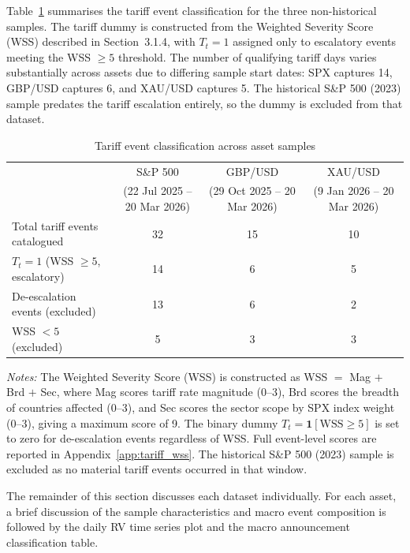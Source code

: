 \documentclass[12pt,a4paper]{report}
\begin{document}
Table~\ref{tab:tariff_summary} summarises the tariff event classification for the three non-historical samples. The tariff dummy is constructed from the Weighted Severity Score (WSS) described in Section~3.1.4, with $T_t = 1$ assigned only to escalatory events meeting the WSS $\geq 5$ threshold. The number of qualifying tariff days varies substantially across assets due to differing sample start dates: SPX captures 14, GBP/USD captures 6, and XAU/USD captures 5. The historical S\&P 500 (2023) sample predates the tariff escalation entirely, so the dummy is excluded from that dataset.

\begin{table}[H]
\centering
\caption{Tariff event classification across asset samples}
\label{tab:tariff_summary}
\begin{threeparttable}
\begin{tabular}{lccc}
\toprule
 & S\&P 500 & GBP/USD & XAU/USD \\
 & (22 Jul 2025 -- 20 Mar 2026) & (29 Oct 2025 -- 20 Mar 2026) & (9 Jan 2026 -- 20 Mar 2026) \\
\midrule
Total tariff events catalogued              & 32 & 15 & 10 \\
\quad $T_t = 1$ (WSS $\geq 5$, escalatory) & 14 & 6  & 5  \\
\quad De-escalation events (excluded)       & 13 & 6  & 2  \\
\quad WSS $< 5$ (excluded)                  & 5  & 3  & 3  \\
\bottomrule
\end{tabular}
\begin{tablenotes}
\small
\item \textit{Notes:} The Weighted Severity Score (WSS) is constructed as WSS $=$ Mag $+$ Brd $+$ Sec,
where Mag scores tariff rate magnitude (0--3), Brd scores the breadth of countries affected (0--3), and
Sec scores the sector scope by SPX index weight (0--3), giving a maximum score of 9. The binary dummy
$T_t = \mathbf{1}[\text{WSS} \geq 5]$ is set to zero for de-escalation events regardless of WSS. Full
event-level scores are reported in Appendix~\ref{app:tariff_wss}. The historical S\&P 500 (2023) sample
is excluded as no material tariff events occurred in that window.
\end{tablenotes}
\end{threeparttable}
\end{table}

\noindent The remainder of this section discusses each dataset individually. For each asset, a brief discussion of the sample characteristics and macro event composition is followed by the daily RV time series plot and the macro announcement classification table.
\end{document}
